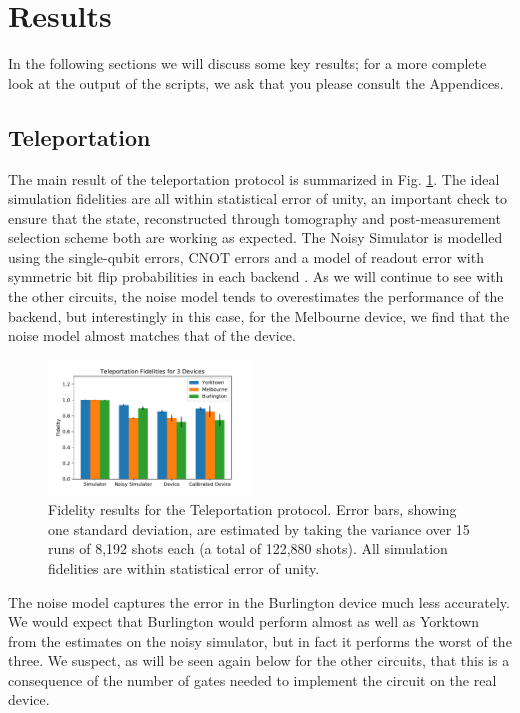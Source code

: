 \section{Results}

In the following sections we will discuss some key results;
for a more complete look at the output of the scripts, we ask that you please
consult the Appendices.

\subsection{Teleportation}

The main result of the teleportation protocol is summarized in Fig.
\ref{fig:teleport_histogram}. The ideal simulation fidelities are all within
statistical error of unity, an important check to ensure that the state,
reconstructed through tomography and post-measurement selection scheme both are
working as expected. The Noisy Simulator is modelled using the single-qubit
errors, CNOT errors and a model of readout error with symmetric bit flip
probabilities in each backend \cite{qiskit_org}. As we will continue to see with
the other circuits, the noise model tends to overestimates the performance of
the backend, but interestingly in this case, for the Melbourne device, we find
that the noise model almost matches that of the device.

\begin{figure}[h!] \centering
	\includegraphics[width=0.48\textwidth]{images/results/teleport_histogram.pdf}
	\caption{Fidelity results for the Teleportation protocol. Error bars, showing
one standard deviation, are estimated by taking the variance over 15 runs of
8,192 shots each (a total of 122,880 shots). All simulation fidelities are
within statistical error of unity.}
	\label{fig:teleport_histogram}
\end{figure}
The noise model captures the error in the Burlington device much less
accurately. We would expect that Burlington would perform almost as well as
Yorktown from the estimates on the noisy simulator, but in fact it performs the
worst of the three. We suspect, as will be seen again below for the other
circuits, that this is a consequence of the number of gates needed to implement
the circuit on the real device.

